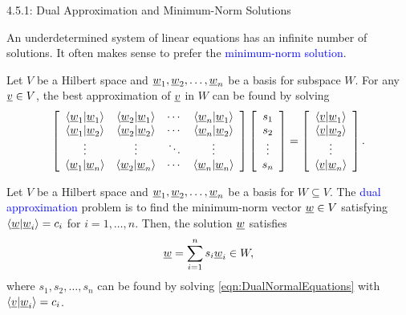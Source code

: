 \documentclass[10pt,letterpaper,english]{beamer}
\begin{document}
\begin{frame}{4.5.1: Dual Approximation and Minimum-Norm Solutions}

An underdetermined system of linear equations has an infinite number of solutions.
It often makes sense to prefer the \textcolor{blue}{minimum-norm solution}.

\vspace{3mm}

Let $V$ be a Hilbert space and $\underline{w}_1 ,\underline{w}_2 , \ldots, \underline{w}_n$ be a basis for subspace $W$.
For any $\underline{v} \in V$, the best approximation of $\underline{v}$ in $W$ can be found by solving
\begin{equation} \label{eqn:DualNormalEquations}
\left[ \begin{array}{cccc}
\left\langle \underline{w}_1 | \underline{w}_1 \right\rangle
& \left\langle \underline{w}_2 | \underline{w}_1 \right\rangle & \cdots
& \left\langle \underline{w}_n | \underline{w}_1 \right\rangle \\
\left\langle \underline{w}_1 | \underline{w}_2 \right\rangle
& \left\langle \underline{w}_2 | \underline{w}_2 \right\rangle & \cdots
& \left\langle \underline{w}_n | \underline{w}_2 \right\rangle \\
\vdots & \vdots & \ddots & \vdots \\
\left\langle \underline{w}_1 | \underline{w}_n \right\rangle
& \left\langle \underline{w}_2 | \underline{w}_n \right\rangle & \cdots
& \left\langle \underline{w}_n | \underline{w}_n \right\rangle
\end{array} \right]
\left[ \begin{array}{c}
s_1 \\ s_2 \\ \vdots \\ s_n \end{array} \right]
= \left[ \begin{array}{c}
\left\langle \underline{v} | \underline{w}_1 \right\rangle \\
\left\langle \underline{v} | \underline{w}_2 \right\rangle \\ \vdots \\
\left\langle \underline{v} | \underline{w}_n \right\rangle \end{array} \right] .
\end{equation}

\begin{theorem}
Let $V$ be a Hilbert space and $\underline{w}_1 ,\underline{w}_2 , \ldots, \underline{w}_n$ be a basis for $W\subseteq V$.
The \textcolor{blue}{dual approximation} problem is to find the minimum-norm vector $\underline{w}\in V$ satisfying $\left\langle \underline{w} | \underline{w}_i \right\rangle = c_i$ for $i=1,\ldots,n$.
Then, the solution $\underline{w}$ satisfies \vspace{-1.5mm}
\[ \vecnot{w} = \sum_{i=1}^n s_i \vecnot{w}_i \in W, \vspace{-1.5mm} \]
where $s_1,s_2,\ldots,s_n$ can be found by solving \eqref{eqn:DualNormalEquations} with $\left\langle \underline{v} | \underline{w}_i \right\rangle = c_i$.
\end{theorem}

\end{frame}
\end{document}
